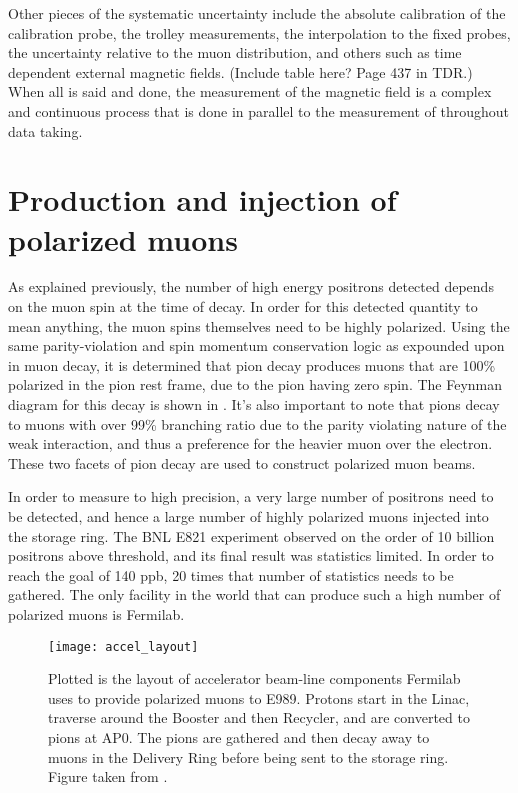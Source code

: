 Other pieces of the systematic uncertainty include the absolute calibration of the calibration probe, the trolley measurements, the interpolation to the fixed probes, the uncertainty relative to the muon distribution, and others such as time dependent external magnetic fields. (Include table here? Page 437 in TDR.) When all is said and done, the measurement of the magnetic field is a complex and continuous process that is done in parallel to the measurement of \wa throughout data taking. 




\section{Production and injection of polarized muons}
\label{sec:Accelerator}

As explained previously, the number of high energy positrons detected depends on the muon spin at the time of decay. In order for this detected quantity to mean anything, the muon spins themselves need to be highly polarized. Using the same parity-violation and spin momentum conservation logic as expounded upon in muon decay, it is determined that pion decay produces muons that are 100\% polarized in the pion rest frame, due to the pion having zero spin. The Feynman diagram for this decay is shown in . It's also important to note that pions decay to muons with over 99\% branching ratio due to the parity violating nature of the weak interaction, and thus a preference for the heavier muon over the electron. These two facets of pion decay are used to construct polarized muon beams. 

In order to measure \gmtwo to high precision, a very large number of positrons need to be detected, and hence a large number of highly polarized muons injected into the storage ring. The BNL E821 experiment observed on the order of 10 billion positrons above threshold, and its final result was statistics limited. In order to reach the goal of 140 ppb, 20 times that number of statistics needs to be gathered. The only facility in the world that can produce such a high number of polarized muons is Fermilab. 

\begin{figure}[]
    \centering
    \texttt{[image: accel\_layout]}
    \caption[Fermilab accelerator layout for muon delivery to E989]{Plotted is the layout of accelerator beam-line components Fermilab uses to provide polarized muons to E989. Protons start in the Linac, traverse around the Booster and then Recycler, and are converted to pions at AP0. The pions are gathered and then decay away to muons in the Delivery Ring before being sent to the \gmtwo storage ring. Figure taken from .}   
    \label{fig:accelerator}
\end{figure}

